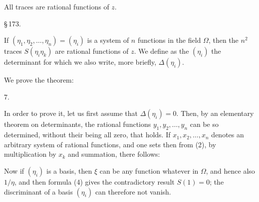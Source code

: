 
All traces are rational functions of $z$.

\S\,173. 

If $(\eta_1, \eta_2, \dots, \eta_n) = (\eta_i)$ is a system of $n$ functions in the field $\Omega$, then the $n^2$ traces $S(\eta_i \eta_k)$ are rational functions of $z$. We define as the  $(\eta_i)$ the determinant
for which we also write, more briefly, $\Delta(\eta_i)$.

We prove the theorem:

7. 

In order to prove it, let us first assume that $\Delta(\eta_i) = 0$. Then, by an elementary theorem on determinants, the rational functions $y_1, y_2, \dots, y_n$ can be so determined, without their being all zero, that
holds. If $x_1, x_2, \dots, x_n$ denotes an arbitrary system of rational functions, and one sets
then from (2), by multiplication by $x_k$ and summation, there follows:

Now if $(\eta_i)$ is a basis, then $\xi$ can be any function whatever in $\Omega$, and hence also $1/\eta$, and then formula (4) gives the contradictory result $S(1) = 0$; the discriminant of a basis $(\eta_i)$ can therefore not vanish.
